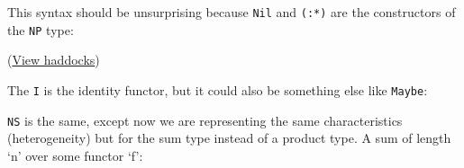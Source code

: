 This syntax should be unsurprising because \texttt{Nil} and
\texttt{(:*)} are the constructors of the \texttt{NP} type:

\begin{Shaded}
\begin{Highlighting}[]
\OperatorTok{\textgreater{}} \OperatorTok{:}
 \OtherTok{ ::}\OtherTok{{-}\textgreater{}} \NormalTok{) }\OtherTok{{-}\textgreater{}}\NormalTok{ [k] }\OtherTok{{-}\textgreater{}}  
  \OtherTok{  ::} 
\OtherTok{  (:*) ::}\OtherTok{{-}\textgreater{}} \OtherTok{{-}\textgreater{}} \OperatorTok{:}
\end{Highlighting}
\end{Shaded}

(\href{https://hackage.haskell.org/package/sop-core-0.5.0.2/docs/Data-SOP.html\#t:NP}{View
haddocks})

The \texttt{I} is the identity functor, but it could also be something
else like \texttt{Maybe}:

\begin{Shaded}
\begin{Highlighting}[]
\OperatorTok{\textgreater{}}  \OperatorTok{:*}   \OperatorTok{:*} \OtherTok{  ::}  \NormalTok{ \textquotesingle{}[}\NormalTok{, }\NormalTok{]}
 \OperatorTok{:*}   \OperatorTok{:*} 
\end{Highlighting}
\end{Shaded}

\texttt{NS} is the same, except now we are representing the same
characteristics (heterogeneity) but for the sum type instead of a
product type. A sum of length `n' over some functor `f':

\begin{Shaded}
\begin{Highlighting}[]
\OperatorTok{\textgreater{}} \OperatorTok{:} 
 \OtherTok{ ::}\OtherTok{{-}\textgreater{}} \NormalTok{) }\OtherTok{{-}\textgreater{}}\NormalTok{ [k] }\OtherTok{{-}\textgreater{}}  
  \OtherTok{ ::}\OtherTok{{-}\textgreater{}} \OperatorTok{:}
  \OtherTok{ ::} \OtherTok{{-}\textgreater{}} \OperatorTok{:}
\end{Highlighting}
\end{Shaded}

